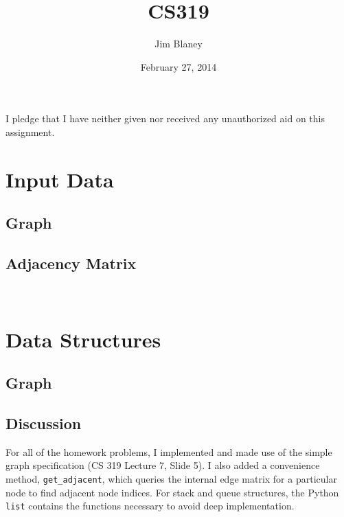\documentclass[6pt]{article}
\title{CS319}
\author{Jim Blaney}
\date{February 27, 2014}
\begin{document}
\setlength{\abovecaptionskip}{0pt}
\setlength{\belowcaptionskip}{5pt}

\noindent I pledge that I have neither given nor received any unauthorized aid on this assignment. \\[4em]

\section*{Input Data}
\begin{minipage}{0.5\textwidth}
\subsection*{Graph}
\end{minipage}
\begin{minipage}{0.5\textwidth}
\subsection*{Adjacency Matrix}
\end{minipage}

\\[1em]

\section*{Data Structures}

\subsection*{Graph}



\subsection*{Discussion}

For all of the homework problems, I implemented and made use of the simple graph specification (CS 319 Lecture 7, Slide 5). I also added a convenience method, \lstinline{get_adjacent}, which queries the internal edge matrix for a particular node to find adjacent node indices. For stack and queue structures, the Python \lstinline{list} contains the functions necessary to avoid deep implementation.
\end{document}
